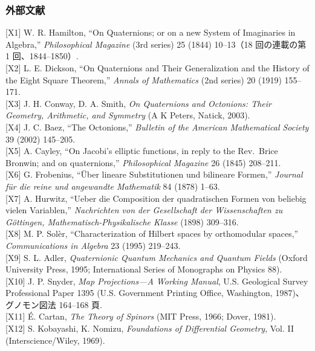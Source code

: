 \documentclass[
  a4paper,
]{ltjsarticle}
\begin{document}
\subsubsection{外部文献}\label{ux5916ux90e8ux6587ux732e}

{[}X1{]} W. R. Hamilton, ``On Quaternions; or on a new System of
Imaginaries in Algebra,'' \emph{Philosophical Magazine} (3rd series) 25
(1844) 10--13（18 回の連載の第 1 回、1844--1850）.\\
{[}X2{]} L. E. Dickson, ``On Quaternions and Their Generalization and
the History of the Eight Square Theorem,'' \emph{Annals of Mathematics}
(2nd series) 20 (1919) 155--171.\\
{[}X3{]} J. H. Conway, D. A. Smith, \emph{On Quaternions and Octonions:
Their Geometry, Arithmetic, and Symmetry} (A K Peters, Natick, 2003).\\
{[}X4{]} J. C. Baez, ``The Octonions,'' \emph{Bulletin of the American
Mathematical Society} 39 (2002) 145--205.\\
{[}X5{]} A. Cayley, ``On Jacobi's elliptic functions, in reply to the
Rev.~Brice Bronwin; and on quaternions,'' \emph{Philosophical Magazine}
26 (1845) 208--211.\\
{[}X6{]} G. Frobenius, ``Über lineare Substitutionen und bilineare
Formen,'' \emph{Journal für die reine und angewandte Mathematik} 84
(1878) 1--63.\\
{[}X7{]} A. Hurwitz, ``Ueber die Composition der quadratischen Formen
von beliebig vielen Variablen,'' \emph{Nachrichten von der Gesellschaft
der Wissenschaften zu Göttingen, Mathematisch-Physikalische Klasse}
(1898) 309--316.\\
{[}X8{]} M. P. Solèr, ``Characterization of Hilbert spaces by
orthomodular spaces,'' \emph{Communications in Algebra} 23 (1995)
219--243.\\
{[}X9{]} S. L. Adler, \emph{Quaternionic Quantum Mechanics and Quantum
Fields} (Oxford University Press, 1995; International Series of
Monographs on Physics 88).\\
{[}X10{]} J. P. Snyder, \emph{Map Projections---A Working Manual}, U.S.
Geological Survey Professional Paper 1395 (U.S. Government Printing
Office, Washington, 1987)、グノモン図法 164--168 頁.\\
{[}X11{]} É. Cartan, \emph{The Theory of Spinors} (MIT Press, 1966;
Dover, 1981).\\
{[}X12{]} S. Kobayashi, K. Nomizu, \emph{Foundations of Differential
Geometry}, Vol. II (Interscience/Wiley, 1969).\\
\end{document}
